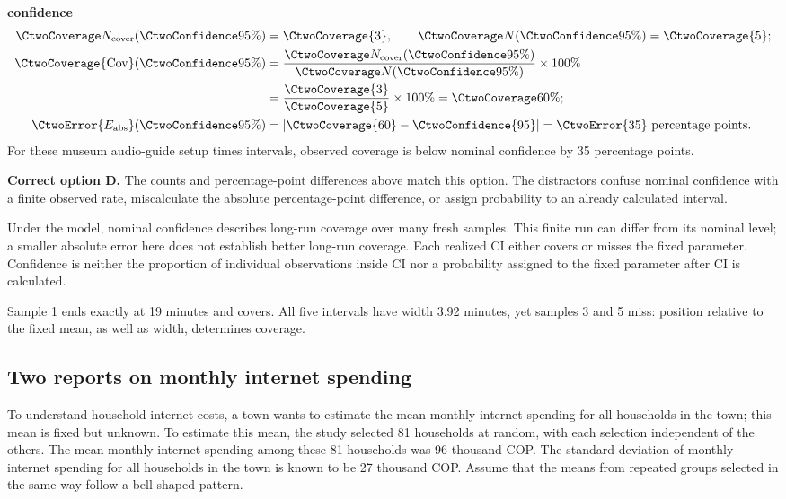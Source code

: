 \textbf{ confidence}\nopagebreak[4]
\begin{align*}
\CtwoCoverCount(\CtwoConfidence{95\%})&=\CtwoCoverage{3},
\qquad\CtwoTotalCount(\CtwoConfidence{95\%})=\CtwoCoverage{5};\\
\CtwoCoverage{\mathrm{Cov}}(\CtwoConfidence{95\%})
&=\frac{\CtwoCoverCount(\CtwoConfidence{95\%})}{\CtwoTotalCount(\CtwoConfidence{95\%})}\times100\%
\\
&=\frac{\CtwoCoverage{3}}{\CtwoCoverage{5}}\times100\%=\CtwoCoverage{60\%};\\
\CtwoError{E_{\rm abs}}(\CtwoConfidence{95\%})
&=\left|\CtwoCoverage{60}-\CtwoConfidence{95}\right|=\CtwoError{35}\ \text{percentage points}.
\end{align*}
For these museum audio-guide setup times intervals, observed coverage is below nominal confidence by 35 percentage points.

\textbf{Correct option D.} The counts and percentage-point differences above match this option. The distractors confuse nominal confidence with a finite observed rate, miscalculate the absolute percentage-point difference, or assign probability to an already calculated interval.

Under the model, nominal confidence describes long-run coverage over many fresh samples. This finite run can differ from its nominal level; a smaller absolute error here does not establish better long-run coverage. Each realized $\mathrm{CI}$ either covers or misses the fixed parameter. Confidence is neither the proportion of individual observations inside $\mathrm{CI}$ nor a probability assigned to the fixed parameter after $\mathrm{CI}$ is calculated.

Sample 1 ends exactly at 19 minutes and covers. All five intervals have width 3.92 minutes, yet samples 3 and 5 miss: position relative to the fixed mean, as well as width, determines coverage.
\par\nopagebreak[4]
\par\vspace{3mm}
\clearpage
\subsection{Two reports on monthly internet spending}
\label{prob:c2-advanced-b}

To understand household internet costs, a town wants to estimate the mean monthly internet spending for all households in the town; this mean is fixed but unknown. To estimate this mean, the study selected 81 households at random, with each selection independent of the others. The mean monthly internet spending among these 81 households was 96 thousand COP. The standard deviation of monthly internet spending for all households in the town is known to be 27 thousand COP. Assume that the means from repeated groups selected in the same way follow a bell-shaped pattern.

